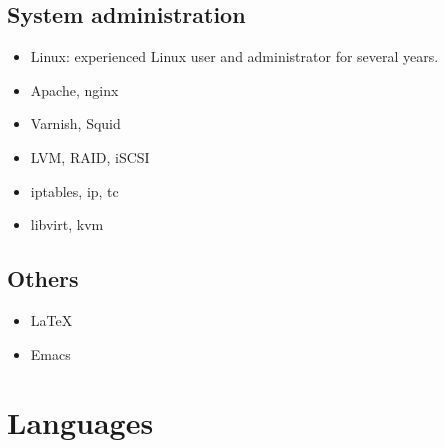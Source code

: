 \documentclass[11pt,a4paper,sans]{moderncv}        %
\begin{document}
\medskip

\subsection{System administration}

\begin{itemize}
\item Linux: experienced Linux user and administrator for several years.
\item Apache, nginx
\item Varnish, Squid
\item LVM, RAID, iSCSI
\item iptables, ip, tc
\item libvirt, kvm
\end{itemize}

\medskip

\subsection{Others}

\begin{itemize}
\item \LaTeX
\item Emacs
\end{itemize}

\section{Languages}

\nocite{*}
\end{document}

